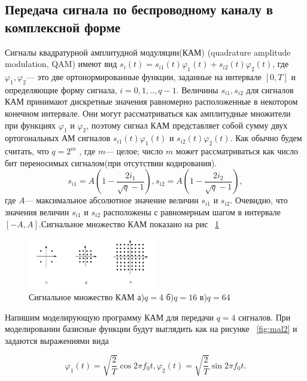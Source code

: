 \subsection{Передача сигнала по беспроводному каналу в комплексной форме}
Сигналы  квадратурной  амплитудной  модуляции(КАМ) (quadrature amplitude modulation, QAM) имеют вид  $s_{i}(t)=s_{i1}(t)\varphi_{1}(t)+s_{i2}(t)\varphi_{2}(t)$, где $\varphi_{1},\varphi_{2}$--- это две  ортонормированные  функции,  заданные  на  интервале $[0,T]$  и определяющие форму сигнала, $i=0,1,..,q-1$. Величины $ s_{i1},s_{i2}$   для  сигналов  КАМ  принимают дискретные  значения  равномерно  расположенные  в  некотором  конечном интервале.  Они  могут  рассматриваться  как  амплитудные  множители  при функциях $\varphi_{1}$ и $\varphi_{2}$, поэтому сигнал КАМ представляет собой сумму двух ортогональных АМ сигналов $s_{i1}(t)\varphi_{1}(t)$ и $s_{i2}(t)\varphi_{2}(t)$.
Как обычно будем считать, что $q=2^{m} $ , где  $m$--- целое; число $m$ может рассматриваться  как  число  бит  переносимых  сигналом(при отсутствии кодирования).
\begin{equation}
s_{i1}=A(1-\dfrac{2i_{1}}{\sqrt{q}-1}),s_{i2}=A(1-\dfrac{2i_{2}}{\sqrt{q}-1}), 
\end{equation} 
где $A$--- максимальное абсолютное значение величин $s_{i1}$ и $s_{i2}$. Очевидно, что значения  величин $ s_{i1}$ и $s_{i2}$ расположены  с  равномерным  шагом  в интервале $[-A,A]$.Сигнальное множество КАМ показано на рис ~\ref{fig:mal1}

\begin{figure}[H]
	\centering
	\includegraphics[width=0.5\textwidth]{img/mal1}
	\caption{Сигнальное множество КАМ а)$q=4$ б)$q=16$ в)$q=64$ }
	\label{fig:mal1}
\end{figure}

Напишим моделирующую программу КАМ для передачи $q=4$ сигналов. При моделировании базисные функции будут выглядить как на рисунке ~\ref{fig:mal2} и задаются выражениями вида 

\begin{equation}
\varphi_{1}(t)=\sqrt{\dfrac{2}{T}}\cos2\pi f_{0}t,
\varphi_{2}(t)=\sqrt{\dfrac{2}{T}}\sin2\pi f_{0}t.
\end{equation} 

